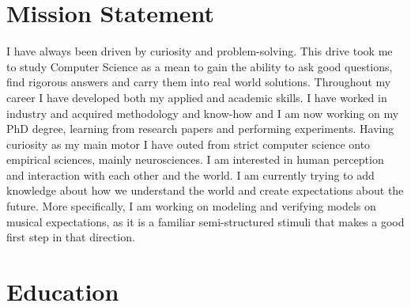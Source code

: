 \documentclass[a4paper]{deedy-resume} %
\begin{document}




\section{Mission Statement}

\begin{flushleft}
I have always been driven by curiosity and problem-solving. This drive took me
to study Computer Science as a mean to gain the ability to ask good
questions, find rigorous answers and carry them into real world solutions.
Throughout my career I have developed both my applied and academic skills. I
have worked in industry and acquired methodology and know-how and I am now
working on my PhD degree, learning from research papers and performing
experiments. Having curiosity as my main motor I have outed from strict
computer science onto empirical sciences, mainly neurosciences. I am
interested in human perception and interaction with each other and the
world. I am currently trying to add knowledge about how we understand the world
and create expectations about the future. More specifically, I am working on
modeling and verifying models on musical expectations, as it is a familiar
semi-structured stimuli that makes a good first step in that direction.
\end{flushleft}


\section{Education} 
\end{document}
